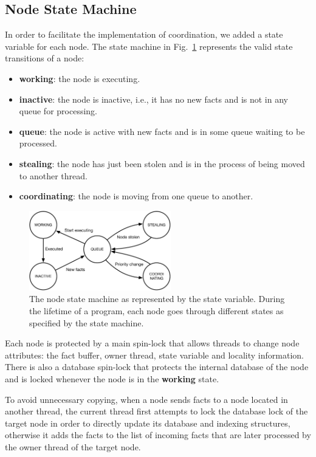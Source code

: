 \subsection{Node State Machine}

In order to facilitate the implementation of coordination, we added a state
variable for each node. The state machine in Fig.~\ref{fig:implementation:node_states}
represents the valid state transitions of a node:

\begin{itemize}
   \item \textbf{working}: the node is executing.
   \item \textbf{inactive}: the node is inactive, i.e., it has no new facts and is not in any
   queue for processing.
   \item \textbf{queue}: the node is active with new facts and is in some queue waiting
   to be processed.
   \item \textbf{stealing}: the node has just been stolen and is in the process of being
   moved to another thread.
   \item \textbf{coordinating}: the node is moving from one queue to another.
\end{itemize}

\begin{figure}[ht]
   \centering
   \includegraphics[width=0.55\textwidth]{figures/implementation/node_states.pdf}
   \caption{The node state machine as represented by the state variable. During
      the lifetime of a program, each node goes through different states as
      specified by the state machine.}
   \label{fig:implementation:node_states}
\end{figure}

Each node is protected by a main spin-lock that allows threads to change node
attributes: the fact buffer, owner thread, state variable and locality
information. There is also a database spin-lock that protects the internal
database of the node and is locked whenever the node is in the \textbf{working}
state.  

To avoid unnecessary copying, when a node sends facts to a node located in
another thread, the current thread first attempts to lock the database lock of
the target node in order to directly update its database and indexing
structures, otherwise it adds the facts to the list of incoming facts that are
later processed by the owner thread of the target node.
